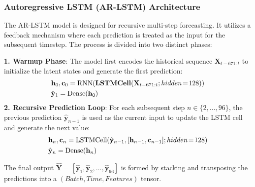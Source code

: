 \documentclass[conference]{IEEEtran}
\begin{document}
	\subsubsection{\textbf{Autoregressive LSTM (AR-LSTM) Architecture}}
	The AR-LSTM model is designed for recursive multi-step forecasting. It utilizes a feedback mechanism where each prediction is treated as the input for the subsequent timestep. The process is divided into two distinct phases:
	
	\textbf{1. Warmup Phase}: The model first encodes the historical sequence $\mathbf{X}_{t-671:t}$ to initialize the latent states and generate the first prediction:
	\begin{equation*}
		\begin{split}
			&\mathbf{h}_0, \mathbf{c}_0 = \text{RNN}(\mathbf{LSTMCell}(\mathbf{X}_{t-671:t}; \small hidden\!=\!128)) \\
			&\hat{\mathbf{y}}_1 = \text{Dense}(\mathbf{h}_0)
		\end{split}
	\end{equation*}
	\textbf{2. Recursive Prediction Loop}: 
	For each subsequent step $n \in \{2, \dots, 96\}$, the previous prediction $\hat{\mathbf{y}}_{n-1}$ is used as the current input to update the LSTM cell and generate the next value:
	\begin{equation*}
		\begin{split}
			&\mathbf{h}_n, \mathbf{c}_n = \text{LSTMCell}(\hat{\mathbf{y}}_{n-1}, [\mathbf{h}_{n-1}, \mathbf{c}_{n-1}]; \small hidden\!=\!128) \\
			&\hat{\mathbf{y}}_n = \text{Dense}(\mathbf{h}_n)
		\end{split}
	\end{equation*}
	
	The final output $\hat{\mathbf{Y}} = [\hat{\mathbf{y}}_1, \hat{\mathbf{y}}_2, \dots, \hat{\mathbf{y}}_{96}]$ is formed by stacking and transposing the predictions into a $(Batch, Time, Features)$ tensor.
	
\end{document}
